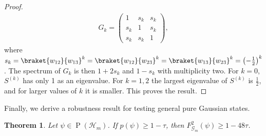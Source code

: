\documentclass[11pt,a4paper]{article}
\newtheorem{theorem}{Theorem}[section]
\numberwithin{equation}{section}
\newcommand{\ot}{\otimes}
\newcommand{\CC}{\mathbbm{C}}
\newcommand{\HH}{\mathcal{H}}
\newcommand{\GG}{\mathcal G}
\newcommand{\1}{\mathbf{1}}
\renewcommand{\P}{\operatorname{P}}
\DeclareMathOperator{\Sym}{Sym}
\DeclarePairedDelimiter\ip{\langle}{\rangle}
\begin{document}
\begin{proof}
    \begin{align*}
    G_k
    =\begin{pmatrix}
       1&s_k&s_k\\
       s_k&1&s_k\\
       s_k&s_k&1
     \end{pmatrix},
\end{align*}
where $s_k = \braket{w_{12}}{w_{13}}^k = \braket{w_{12}}{w_{23}}^k = \braket{w_{13}}{w_{23}}^k = \left(-\frac12 \right)^k$.
The spectrum of $G_k$ is then $1 + 2s_k$ and $1 - s_k$ with multiplicity two. For $k = 0$, $S^{(k)}$ has only 1 as an eigenvalue.
For $k = 1, 2$ the largest eigenvalue of $S^{(k)}$ is $\frac12$, and for larger values of $k$ it is smaller. This proves the result.
\end{proof}

Finally, we derive a robustness result for testing general pure Gaussian states.

\begin{theorem}\label{thm:main boson}
    Let $\psi \in \P(\HH_m)$. If $p(\psi) \geq 1 - \tau$, then $F^2_{\GG_m}(\psi) \geq 1 - 48 \tau$.
\end{theorem}
\end{document}
